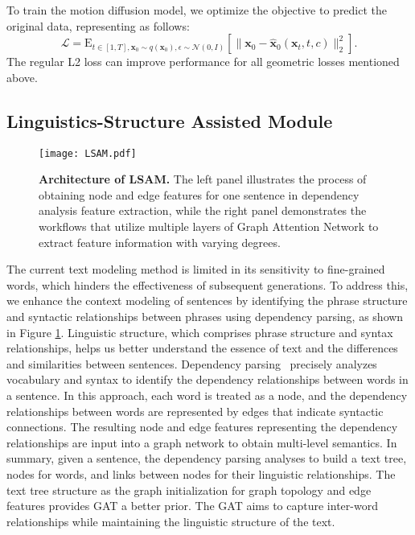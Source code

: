 \documentclass[10pt,twocolumn,letterpaper]{article}
\begin{document}
To train the motion diffusion model, we optimize the objective to predict the original data, representing as follows:
\begin{equation}
    \mathcal{L}=\mathrm{E}_{t \in [1,T], \mathbf{x}_0 \sim q(\mathbf{x}_0),\epsilon \sim \mathcal{N}(0, I)} [\parallel \mathbf{x}_0 - \hat{\mathbf{x}}_0(\mathbf{x}_t,t,c) \parallel_2^2].
\end{equation}
The regular L2 loss can improve performance for all geometric losses mentioned above.







\subsection{Linguistics-Structure Assisted Module}
\label{sec:LSAM}

\begin{figure}[t]
  \centering
  \texttt{[image: LSAM.pdf]}
  \caption{\textbf{Architecture of LSAM.}
  The left panel illustrates the process of obtaining node and edge features for one sentence in dependency analysis feature extraction, while the right panel demonstrates the workflows that utilize multiple layers of Graph Attention Network to extract feature information with varying degrees.}
\label{fig:LSAM}
\end{figure}

The current text modeling method is limited in its sensitivity to fine-grained words, which hinders the effectiveness of subsequent generations. To address this, we enhance the context modeling of sentences by identifying the phrase structure and syntactic relationships between phrases using dependency parsing, as shown in Figure \ref{fig:LSAM}. Linguistic structure, which comprises phrase structure and syntax relationships, helps us better understand the essence of text and the differences and similarities between sentences. Dependency parsing~\cite{nivre2008algorithms} precisely analyzes vocabulary and syntax to identify the dependency relationships between words in a sentence. In this approach, each word is treated as a node, and the dependency relationships between words are represented by edges that indicate syntactic connections. The resulting node and edge features representing the dependency relationships are input into a graph network to obtain multi-level semantics.
In summary, given a sentence, the dependency parsing analyses to build a text tree, nodes for words, and links between nodes for their linguistic relationships. The text tree structure as the graph initialization for graph topology and edge features provides GAT a better prior. The GAT aims to capture inter-word relationships while maintaining the linguistic structure of the text.
\end{document}
